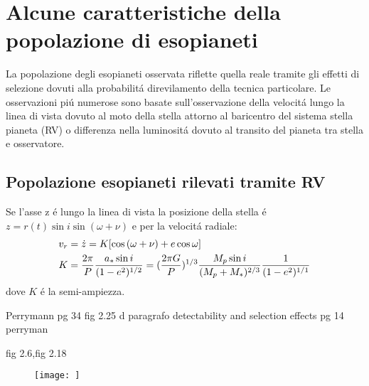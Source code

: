 {\let\clearpage\relax\let\cleardoublepage\relax
\chapter{Alcune caratteristiche della popolazione di esopianeti}
}

La popolazione degli esopianeti osservata riflette quella reale tramite gli effetti di selezione dovuti alla probabilit\'a direvilamento della tecnica particolare. Le osservazioni pi\'u numerose sono basate sull'osservazione della velocit\'a lungo la linea di vista dovuto al moto della stella attorno al baricentro del sistema stella pianeta (RV) o differenza nella luminosit\'a dovuto al transito del pianeta tra stella e osservatore.

\section{Popolazione esopianeti rilevati tramite RV}

Se l'asse z \'e lungo la linea di vista la posizione della stella \'e $z=r(t)\sin{i}\sin{(\omega+\nu)}$ e per la velocit\'a radiale:
\begin{align}
&v_r=\dot{z}=K[\cos{(\omega+\nu)}+e\cos{\omega}]\label{eq:vrsignal}\\
&K=\frac{2\pi}{P}\frac{a_*\sin{i}}{(1-e^2)^{1/2}}=(\frac{2\pi G}{P})^{1/3}\frac{M_p\sin{i}}{(M_p+M_*)^{2/3}}\frac{1}{(1-e^2)^{1/1}}
\end{align}
dove $K$ \'e la semi-ampiezza.


\begin{workout}
Perrymann pg 34 fig 2.25 d
paragrafo detectability and selection effects pg 14 perryman
\end{workout}

\begin{workout}
fig 2.6,fig 2.18
\end{workout}

\begin{figure}[!ht]
\texttt{[image: ]}
\end{figure}

